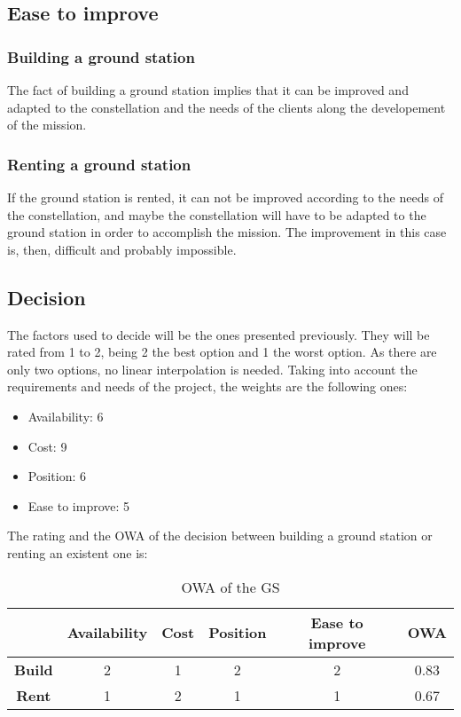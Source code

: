 \subsection{Ease to improve}

\subsubsection{Building a ground station}
The fact of building a ground station implies that it can be improved and adapted to the constellation and the needs of the clients along the developement of the mission.
 
\subsubsection{Renting a ground station}
If the ground station is rented, it can not be improved according to the needs of the constellation, and maybe the constellation will have to be adapted to the ground station in order to accomplish the mission. The improvement in this case is, then, difficult and probably impossible.

\subsection{Decision}
The factors used to decide will be the ones presented previously. They will be rated from 1 to 2, being 2 the best option and 1 the worst option. As there are only two options, no linear interpolation is needed. Taking into account the requirements and needs of the project, the weights are the following ones:
\begin{itemize}
\item Availability: 6
\item Cost: 9
\item Position: 6 
\item Ease to improve: 5
\end{itemize}
The rating and the OWA of the decision between building a ground station or renting an existent one is:
\begin{table}[H]
\begin{center}
\begin{tabular}{|c|c|c|c|c|c|}
\hline
&\textbf{Availability}&\textbf{Cost}&\textbf{Position}&\textbf{Ease to improve}&\textbf{OWA}\\
\hline
\textbf{Build}&2&1&2&2&0.83\\
\hline
\textbf{Rent}&1&2&1&1&0.67\\
\hline
\end{tabular}
\caption{OWA of the GS}
\end{center}
\end{table}